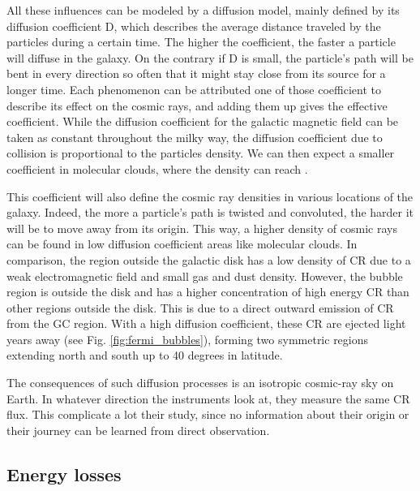 All these influences can be modeled by a diffusion model, mainly defined by its diffusion coefficient D, which describes the average distance traveled by the particles during a certain time. The higher the coefficient, the faster a particle will diffuse in the galaxy. On the contrary if D is small, the particle's path will be bent in every direction so often that it might stay close from its source for a longer time. Each phenomenon can be attributed one of those coefficient to describe its effect on the cosmic rays, and adding them up gives the effective coefficient. 
While the diffusion coefficient for the galactic magnetic field can be taken as constant throughout the milky way, the diffusion coefficient due to collision is proportional to the particles density. We can then expect a smaller coefficient in molecular clouds, where the density can reach .

This coefficient will also define the cosmic ray densities in various locations of the galaxy. Indeed, the more a particle's path is twisted and convoluted, the harder it will be to move away from its origin. This way, a higher density of cosmic rays can be found in low diffusion coefficient areas like molecular clouds. In comparison, the region outside the galactic disk has a low density of CR due to a weak electromagnetic field and small gas and dust density. 
However, the bubble region is outside the disk and has a higher concentration of high energy CR than other regions outside the disk. This is due to a direct outward emission of CR from the GC region. With a high diffusion coefficient, these CR are ejected light years away (see Fig. \ref{fig:fermi_bubbles}), forming two symmetric regions extending north and south up to 40 degrees in latitude.

The consequences of such diffusion processes is an isotropic cosmic-ray sky on Earth. In whatever direction the instruments look at, they measure the same CR flux. This complicate a lot their study, since no information about their origin or their journey can be learned from direct observation. 

\subsection{Energy losses}


